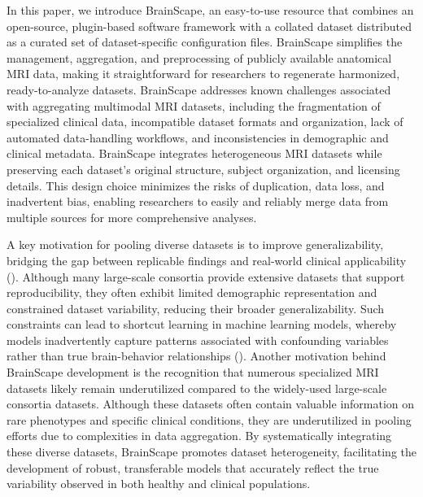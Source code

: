 In this paper, we introduce BrainScape, an easy-to-use resource that combines an open-source, 
plugin-based software framework with a collated dataset distributed as a curated set of 
dataset-specific configuration files.
BrainScape simplifies the management, aggregation, and preprocessing of publicly available anatomical MRI data, 
making it straightforward for researchers to regenerate harmonized, ready-to-analyze datasets.
BrainScape addresses known challenges associated with aggregating multimodal MRI datasets, 
including the fragmentation of specialized clinical data, incompatible dataset formats and organization, 
lack of automated data-handling workflows, and inconsistencies in demographic and clinical metadata.
BrainScape integrates heterogeneous MRI datasets while preserving each dataset's original structure, 
subject organization, and licensing details.
This design choice minimizes the risks of duplication, data loss, and inadvertent bias, 
enabling researchers to easily and reliably merge data from multiple sources 
for more comprehensive analyses.

A key motivation for pooling diverse datasets is to improve generalizability, 
bridging the gap between replicable findings and real-world clinical applicability 
(\cite{marek2024replicability, adkinson2024brain, yang2024limits}).
Although many large-scale consortia provide extensive datasets that support reproducibility, 
they often exhibit limited demographic representation and constrained dataset variability, 
reducing their broader generalizability. 
Such constraints can lead to shortcut learning in machine learning models, 
whereby models inadvertently capture patterns associated with confounding variables 
rather than true brain-behavior relationships (\cite{marek2024replicability, yang2024limits}). 
Another motivation behind BrainScape development is the recognition that 
numerous specialized MRI datasets likely remain underutilized 
compared to the widely-used large-scale consortia datasets. 
Although these datasets often contain valuable information on rare phenotypes and specific clinical conditions, 
they are underutilized in pooling efforts due to complexities in data aggregation. 
By systematically integrating these diverse datasets, BrainScape promotes 
dataset heterogeneity, facilitating the development of robust, transferable models 
that accurately reflect the true variability observed in both healthy and clinical populations.

